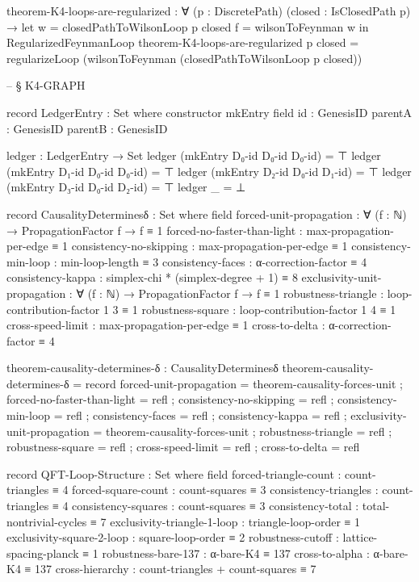 \documentclass[11pt,a4paper]{book}
\begin{document}
\begin{code}
theorem-K4-loops-are-regularized : ∀ (p : DiscretePath) (closed : IsClosedPath p) →
  let w = closedPathToWilsonLoop p closed
      f = wilsonToFeynman w
  in RegularizedFeynmanLoop
theorem-K4-loops-are-regularized p closed = 
  regularizeLoop (wilsonToFeynman (closedPathToWilsonLoop p closed))


-- § K4-GRAPH

record LedgerEntry : Set where
  constructor mkEntry
  field
    id      : GenesisID
    parentA : GenesisID
    parentB : GenesisID

ledger : LedgerEntry → Set
ledger (mkEntry D₀-id D₀-id D₀-id) = ⊤
ledger (mkEntry D₁-id D₀-id D₀-id) = ⊤
ledger (mkEntry D₂-id D₀-id D₁-id) = ⊤
ledger (mkEntry D₃-id D₀-id D₂-id) = ⊤
ledger _                     = ⊥

record CausalityDeterminesδ : Set where
  field
    forced-unit-propagation    : ∀ (f : ℕ) → PropagationFactor f → f ≡ 1
    forced-no-faster-than-light : max-propagation-per-edge ≡ 1
    consistency-no-skipping    : max-propagation-per-edge ≡ 1
    consistency-min-loop       : min-loop-length ≡ 3
    consistency-faces          : α-correction-factor ≡ 4
    consistency-kappa          : simplex-chi * (simplex-degree + 1) ≡ 8
    exclusivity-unit-propagation : ∀ (f : ℕ) → PropagationFactor f → f ≡ 1
    robustness-triangle : loop-contribution-factor 1 3 ≡ 1
    robustness-square   : loop-contribution-factor 1 4 ≡ 1
    cross-speed-limit   : max-propagation-per-edge ≡ 1
    cross-to-delta      : α-correction-factor ≡ 4

theorem-causality-determines-δ : CausalityDeterminesδ
theorem-causality-determines-δ = record
  { forced-unit-propagation = theorem-causality-forces-unit
  ; forced-no-faster-than-light = refl
  ; consistency-no-skipping = refl
  ; consistency-min-loop = refl
  ; consistency-faces = refl
  ; consistency-kappa = refl
  ; exclusivity-unit-propagation = theorem-causality-forces-unit
  ; robustness-triangle = refl
  ; robustness-square = refl
  ; cross-speed-limit = refl
  ; cross-to-delta = refl
  }

record QFT-Loop-Structure : Set where
  field
    forced-triangle-count : count-triangles ≡ 4
    forced-square-count : count-squares ≡ 3
    consistency-triangles : count-triangles ≡ 4
    consistency-squares : count-squares ≡ 3
    consistency-total : total-nontrivial-cycles ≡ 7
    exclusivity-triangle-1-loop : triangle-loop-order ≡ 1
    exclusivity-square-2-loop : square-loop-order ≡ 2
    robustness-cutoff : lattice-spacing-planck ≡ 1
    robustness-bare-137 : α-bare-K4 ≡ 137
    cross-to-alpha : α-bare-K4 ≡ 137
    cross-hierarchy : count-triangles + count-squares ≡ 7



\end{code}
\end{document}
